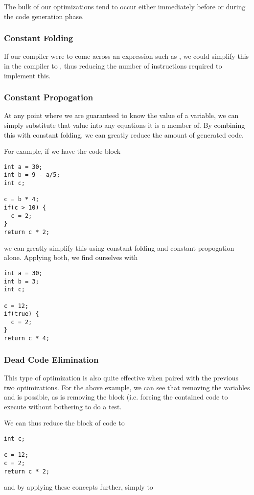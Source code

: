 \documentclass[12pt]{article}
\begin{document}
The bulk of our optimizations tend to occur either immediately before or during the code generation phase.

\subsubsection*{Constant Folding}
If our compiler were to come across an expression such as , we could simplify this in the compiler to , thus reducing the number of instructions required to implement this.

\subsubsection*{Constant Propogation}
At any point where we are guaranteed to know the value of a variable, we can simply substitute that value into any equations it is a member of. By combining this with constant folding, we can greatly reduce the amount of generated code.

For example, if we have the code block
\begin{verbatim}
int a = 30;
int b = 9 - a/5;
int c;

c = b * 4;
if(c > 10) {
  c = 2;
}
return c * 2;
\end{verbatim}
we can greatly simplify this using constant folding and constant propogation alone. Applying both, we find ourselves with
\begin{verbatim}
int a = 30;
int b = 3;
int c;

c = 12;
if(true) {
  c = 2;
}
return c * 4;
\end{verbatim}

\subsubsection*{Dead Code Elimination}
This type of optimization is also quite effective when paired with the previous two optimizations. For the above example, we can see that removing the variables  and  is possible, as is removing the  block (i.e. forcing the contained code to execute without bothering to do a test.

We can thus reduce the block of code to
\begin{verbatim}
int c;

c = 12;
c = 2;
return c * 2;
\end{verbatim}
and by applying these concepts further, simply to 
\end{document}
